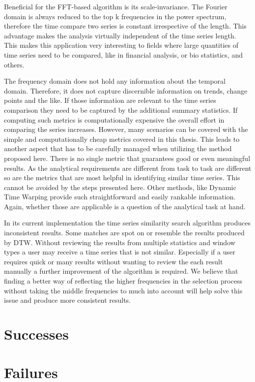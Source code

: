 \documentclass[phd,black, hidelinks]{PrincetonThesis}
\begin{document}
Beneficial for the FFT-based algorithm is its scale-invariance. The Fourier domain is always reduced to the top k frequencies in the power spectrum, therefore the time compare two series is constant irrespective of the length. This advantage makes the analysis virtually independent of the time series length. This makes this application very interesting to fields where large quantities of time series need to be compared, like in financial analysis, or bio statistics, and others.

The frequency domain does not hold any information about the temporal domain. Therefore, it does not capture discernible information on trends, change points and the like. If those information are relevant to the time series comparison they need to be captured by the additional summary statistics. If computing such metrics is computationally expensive the overall effort in comparing the series increases. However, many scenarios can be covered with the simple and computationally cheap metrics covered in this thesis. This leads to another aspect that has to be carefully managed when utilizing the method proposed here. There is no single metric that guarantees good or even meaningful results. As the analytical requirements are different from task to task are different so are the metrics that are most helpful in identifying similar time series. This cannot be avoided by the steps presented here. Other methods, like Dynamic Time Warping provide such straightforward and easily rankable information. Again, whether those are applicable is a question of the analytical task at hand.

In its current implementation the time series similarity search algorithm produces inconsistent results. Some matches are spot on or resemble the results produced by DTW. Without reviewing the results from multiple statistics and window types a user may receive a time series that is not similar. Especially if a user requires quick or many results without wanting to review the each result manually a further improvement of the algorithm is required. We believe that finding a better way of reflecting the higher frequencies in the selection process without taking the middle frequencies to much into account will help solve this issue and produce more consistent results.


\section{Successes}
\label{sec:org5426584}
\section{Failures}
\label{sec:orgda645ab}
\end{document}

